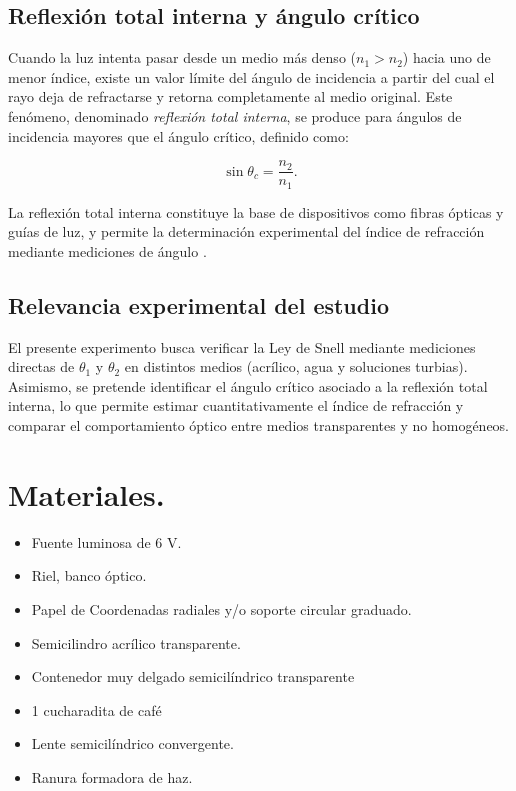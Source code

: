 \documentclass[11pt,twocolumn]{article}
\makeatletter
\let\orig@cite\cite
\renewcommand{\cite}[1]{\textcolor{Blue}{\orig@cite{#1}}}
\let\orig@parencite\parencite
\renewcommand{\parencite}[1]{\textcolor{Blue}{\orig@parencite{#1}}}
\renewcommand{\cite}[1]{\parencite{#1}}      %
\let\orig@cite\cite
\renewcommand{\cite}[1]{\textcolor{Blue}{\orig@cite{#1}}} %
\makeatother
\begin{document}
\subsection{Reflexión total interna y ángulo crítico}

Cuando la luz intenta pasar desde un medio más denso ($n_{1} > n_{2}$) hacia uno de menor índice, existe un valor límite del ángulo de incidencia a partir del cual el rayo deja de refractarse y retorna completamente al medio original. Este fenómeno, denominado \textit{reflexión total interna}, se produce para ángulos de incidencia mayores que el ángulo crítico, definido como:

\begin{equation}
    \sin \theta_{c} = \frac{n_{2}}{n_{1}}.
\end{equation}

La reflexión total interna constituye la base de dispositivos como fibras ópticas y guías de luz, y permite la determinación experimental del índice de refracción mediante mediciones de ángulo \cite{feynman_lectures_2010}.

\subsection{Relevancia experimental del estudio}

El presente experimento busca verificar la Ley de Snell mediante mediciones directas de $\theta_{1}$ y $\theta_{2}$ en distintos medios (acrílico, agua y soluciones turbias). Asimismo, se pretende identificar el ángulo crítico asociado a la reflexión total interna, lo que permite estimar cuantitativamente el índice de refracción y comparar el comportamiento óptico entre medios transparentes y no homogéneos. 


\section{Materiales.}

\begin{itemize}
    \item Fuente luminosa de 6 V.
    \item Riel, banco óptico.
    \item Papel de Coordenadas radiales y/o soporte circular graduado.
    \item Semicilindro acrílico transparente.
    \item Contenedor muy delgado semicilíndrico transparente
    \item 1 cucharadita de café
    \item Lente semicilíndrico convergente.
    \item Ranura formadora de haz.
\end{itemize}
\end{document}
